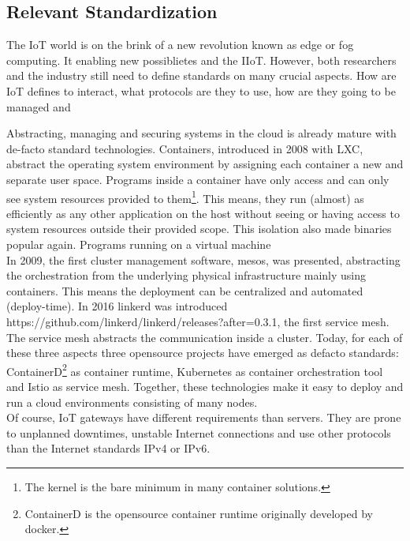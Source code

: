 \subsection{Relevant Standardization}
The IoT world is on the brink of a new revolution known as edge or fog computing. It  enabling new possiblietes and the IIoT. However, both researchers and the industry still need to define standards on many crucial aspects. How are IoT defines to interact, what protocols are they to use, how are they going to be managed and 

Abstracting, managing and securing systems in the cloud is already mature with de-facto standard technologies. Containers, introduced in 2008 with LXC, abstract the operating system environment by assigning each container a new and separate user space. Programs inside a container have only access and can only see system resources provided to them\footnote{The kernel is the bare minimum in many container solutions.}. This means, they run (almost) as efficiently as any other application on the host without seeing or having access to system resources outside their provided scope. This isolation also made binaries popular again. Programs running on a virtual machine\\
In 2009, the first cluster management software, mesos, was presented, abstracting the orchestration from the underlying physical infrastructure mainly using containers. This means the deployment can be centralized and automated (deploy-time). In 2016 linkerd was introduced https://github.com/linkerd/linkerd/releases?after=0.3.1, the first service mesh. The service mesh abstracts the communication inside a cluster. Today, for each of these three aspects three opensource projects have emerged as defacto standards: ContainerD\footnote{ContainerD is the opensource container runtime originally developed by docker.} as container runtime, Kubernetes as container orchestration tool and Istio as service mesh. Together, these technologies make it easy to deploy and run a cloud environments consisting of many nodes.\\
Of course, IoT gateways have different requirements than servers. They are prone to unplanned downtimes, unstable Internet connections and use other protocols than the Internet standards IPv4 or IPv6. 